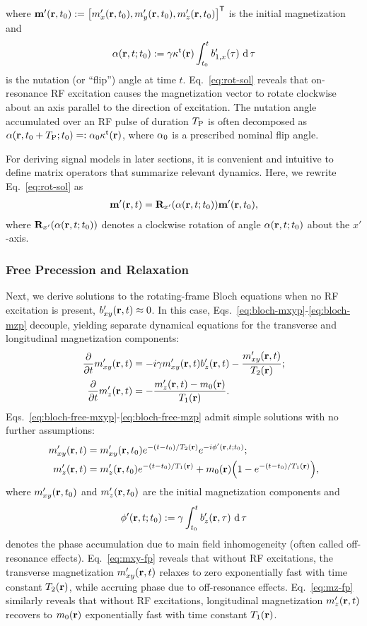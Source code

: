 where 
$\bmmp\prtz := \brac{\mxp\prtz,\myp\prtz,\mzp\prtz}\tpose$ 
is the initial magnetization and
\begin{align}
	\fliprt := \gam \stx\pr \int_{t_0}^t \bonexp\paren{\tau} \der{\tau} 
	\label{eq:flip-def}
\end{align}
is the nutation (or ``flip'') angle at time $t$.
Eq.~\eqref{eq:rot-sol} reveals 
that on-resonance RF excitation
causes the magnetization vector
to rotate clockwise
about an axis parallel to
the direction of excitation.
The nutation angle
accumulated over an RF pulse 
of duration $T_\mathrm{P}$
is often decomposed as
$\flip\prtzt{t_0+\TP} =: \flipnom \stx\pr$,
where $\alpha_0$
is a prescribed nominal flip angle.

For deriving signal models
in later sections,
it is convenient and intuitive
to define matrix operators
that summarize relevant dynamics.
Here, we rewrite Eq.~\eqref{eq:rot-sol} as 
\begin{align}
	\bmmp\prt = \bmRxp{\fliprt} \bmmp\prtz,
	\label{eq:mtx-ex}
\end{align}
where $\bmRxp{\fliprt}$ denotes a clockwise rotation
of angle $\fliprt$ 
about the $x'$-axis.

\subsubsection{Free Precession and Relaxation}
\label{sss,bkgrd,mri,bloch,pr}

Next,
we derive solutions
to the rotating-frame Bloch equations
when no RF excitation is present,
\ie $\bxyp\prt \approx 0$.
In this case,
Eqs.~\eqref{eq:bloch-mxyp}-\eqref{eq:bloch-mzp} decouple,
yielding separate dynamical equations
for the transverse and longitudinal magnetization components:
\begin{align}
	\dela{t} \mxyp\prt &= -i\gam \mxyp\prt \bzp\prt - \frac{\mxyp\prt}{\Tt\pr} ;
		\label{eq:bloch-free-mxyp} \\
	\dela{t} \mzp\prt &= -\frac{\mzp\prt - \mzero\pr}{\To\pr}.
		\label{eq:bloch-free-mzp}
\end{align}
Eqs.~\eqref{eq:bloch-free-mxyp}-\eqref{eq:bloch-free-mzp}
admit simple solutions
with no further assumptions: 
\begin{align}
	\mxyp\prt &= \mxyp\prtz e^{-(t-t_0)/\Tt\pr} e^{-i \phprt}; 
		\label{eq:mxy-fp} \\
	\mzp\prt &= \mzp\prtz e^{-(t-t_0)/\To\pr} + \mzero\pr \paren{1-e^{-(t-t_0)/\To\pr}},
		\label{eq:mz-fp}
\end{align}
where $\mxyp\prtz$ and $\mzp\prtz$ 
are the initial magnetization components and
\begin{align}
	\phprt := \gam \int_{t_0}^t \bzp\paren{\bmr,\tau} \der{\tau}
	\label{eq:ph-def}
\end{align}
denotes the phase accumulation
due to main field inhomogeneity
(often called off-resonance effects).
Eq.~\eqref{eq:mxy-fp} reveals that without RF excitations,
the transverse magnetization $\mxyp\prt$
relaxes to zero exponentially fast 
with time constant $\Tt\pr$,
while accruing phase due to off-resonance effects.
Eq.~\eqref{eq:mz-fp} similarly reveals
that without RF excitations,
longitudinal magnetization $\mzp\prt$
recovers to $\mzero\pr$ exponentially fast 
with time constant $\To\pr$.

